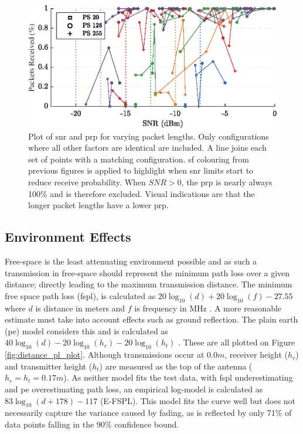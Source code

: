 \begin{figure}[H]
    \centering
   	\includegraphics{Figures/pl_pp_plot}
    \caption[Effect of Packet Length on \ac{snr} and \ac{prp}]{
    Plot of \ac{snr} and \ac{prp} for varying packet lengths. Only configurations where all other factors are identical are included. A line joins each set of points with a matching configuration. \ac{sf} colouring from previous figures is applied to highlight when \ac{snr} limits start to reduce receive probability. When $SNR > 0$, the \ac{prp} is nearly always 100\% and is therefore excluded. Visual indications are that the longer packet lengths have a lower \ac{prp}.
    }
    \label{fig:pl_pp_plot}
\end{figure}

\subsection{Environment Effects}
Free-space is the least attenuating environment possible and as such a transmission in free-space should represent the minimum path loss over a given distance; directly leading to the maximum transmission distance. The minimum free space path loss (\ac{fspl}), is calculated as $20\log_{10}(d) + 20\log_{10}(f) - 27.55$ where $d$ is distance in meters and $f$ is frequency in MHz \cite{3YP:ANTENNA_BOOK}. A more reasonable estimate must take into account effects such as ground reflection. The plain earth (\ac{pe}) model considers this and is calculated as $40\log_{10}(d) - 20\log_{10}(h_r) - 20\log_{10}(h_t)$ \cite{3YP:COMBINING_MODELS}. These are all plotted on Figure \ref{fig:distance_pl_plot}. Although transmissions occur at $0.0m$, receiver height ($h_r$) and transmitter height ($h_t$) are measured as the top of the antenna ($h_r = h_t = 0.17m$). As neither model fits the test data, with \ac{fspl} underestimating and \ac{pe} overestimating path loss, an empirical log-model is calculated as $83\log_{10}(d+178)-117$ (E-FSPL). This model fits the curve well but does not necessarily capture the variance caused by fading, as is reflected by only 71\% of data points falling in the 90\% confidence bound. 

